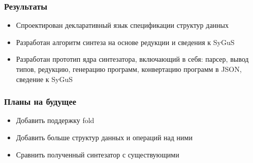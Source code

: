 \documentclass[14pt]{beamer}
\begin{document}
\begin{frame}
\frametitle{Результаты}
\begin{itemize}
    \item Спроектирован декларативный язык спецификации структур данных
    \item Разработан алгоритм синтеза на основе редукции и сведения к SyGuS
    \item Разработан прототип ядра синтезатора, включающий в себя: парсер, вывод типов, редукцию, генерацию программ, конвертацию программ в JSON, сведение к SyGuS
\end{itemize}
\end{frame}


\begin{frame}
\frametitle{Планы на будущее}
\begin{itemize}
    \item Добавить поддержку fold
    \item Добавить больше структур данных и операций над ними
    \item Сравнить полученный синтезатор с существующими
\end{itemize}
\end{frame}
\end{document}
